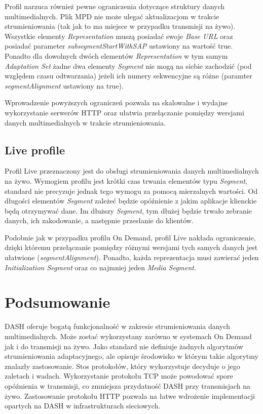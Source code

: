 Profil narzuca również pewne ograniczenia dotyczące struktury danych multimedialnych. Plik MPD nie może ulegać aktualizacjom w trakcie strumieniowania (tak jak to ma miejsce w przypadku transmisji na żywo). Wszystkie elementy \textit{Representation} muszą posiadać swoje \textit{Base URL} oraz posiadać parameter \textit{subsegmentStartWithSAP} ustawiony na wartość true. Ponadto dla dowolnych dwóch elementów \textit{Representation} w tym samym \textit{Adaptation Set} żadne dwa elementy \textit{Segment} nie mogą na siebie zachodzić (pod względem czasu odtwarzania) jeżeli ich numery sekwencyjne są różne (paramter \textit{segmentAlignment} ustawiony na true).

Wprowadzenie powyższych ograniczeń pozwala na skalowalne i wydajne wykorzystanie serwerów HTTP oraz ułatwia przełączanie pomiędzy wersjami danych multimedialnych w trakcie strumieniowania.

\subsection{Live profile}

Profil Live przeznaczony jest do obsługi strumieniowania danych multimedialnych na żywo. Wymogiem profilu jest krótki czas trwania elementów typu \textit{Segment}, standard nie precyzuje jednak tego wymogu za pomocą mierzalnych wartości. Od długości elementów \textit{Segment} zależeć będzie opóźnienie z jakim aplikacje klienckie będą otrzymywać dane. Im dłuższy \textit{Segment}, tym dłużej będzie trwało zebranie danych, ich zakodowanie, a następnie przesłanie do klientów. 

Podobnie jak w przypadku profilu On Demand, profil Live nakłada ograniczenie, dzięki któremu przełączanie pomiędzy różnymi wersjami tych samych danych jest ułatwione (\textit{segmentAlignment}). Ponadto, każda reprezentacja musi zawierać jeden \textit{Initialization Segment} oraz co najmniej jeden \textit{Media Segment}. 

\section{Podsumowanie}

DASH oferuje bogatą funkcjonalność w zakresie strumieniowania danych multimedialnych. Może zostać wykorzystany zarówno w systemach On Demand jak i do transmisji na żywo. Jako standard nie definiuje żadnych algorytmów strumieniowania adaptacyjnego, ale opisuje środowisko w którym takie algorytmy znalazły zastosowanie. Stos protokołów, który wykorzystuje decyduje o jego zaletach i wadach. Wykorzystanie protokołu TCP może powodować spore opóźnienia w transmisji, co zmniejsza przydatność DASH przy transmisjach na żywo. Zastosowanie protokołu HTTP pozwala na łatwe wdrożenie implementacji opartych na DASH w infrastrukturach sieciowych.

